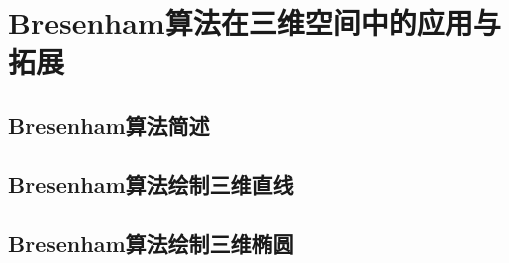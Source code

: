 \section{Bresenham算法在三维空间中的应用与拓展}
\subsection{Bresenham算法简述}
\subsection{Bresenham算法绘制三维直线}
\subsection{Bresenham算法绘制三维椭圆}